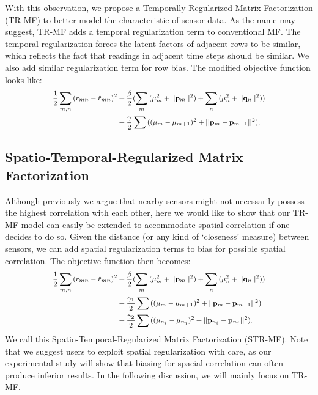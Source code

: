 With this observation, we propose a Temporally-Regularized Matrix Factorization (TR-MF) to better model the characteristic of sensor data. As the name may suggest, TR-MF adds a temporal regularization term to conventional MF.
The temporal regularization forces the latent factors of adjacent rows to be similar, which reflects the fact that 
readings in adjacent time steps should be similar. We also add similar regularization term for row bias.
The modified objective function looks like: 
\begin{equation*}\small \begin{aligned}
\frac{1}{2}\sum_{m,n}{(r_{mn} - \hat{r}_{mn})}^2
&+ \frac{\beta}{2}(\sum_m{(\mu_m^2 + ||\mathbf{p}_m||^2)} + \sum_n{(\mu_n^2 + ||\mathbf{q}_n||^2)}) \\
&+ \frac{\gamma}{2} \sum{((\mu_m-\mu_{m+1})^2 + ||\mathbf{p}_m-\mathbf{p}_{m+1}||^2)}.
\end{aligned}\end{equation*}

\subsection{Spatio-Temporal-Regularized Matrix Factorization}
Although previously we argue that nearby sensors might not necessarily possess the highest correlation with each other, 
here we would like to show that our TR-MF model can easily be extended to accommodate spatial correlation if one decides to do so. 
Given the distance (or any kind of `closeness' measure) between sensors, we can add spatial regularization terms to bias for 
possible spatial correlation.
The objective function then becomes: 
\begin{equation*}\small \begin{aligned}
\frac{1}{2}\sum_{m,n}{(r_{mn} - \hat{r}_{mn})}^2
&+ \frac{\beta}{2}(\sum_m{(\mu_m^2 + ||\mathbf{p}_m||^2)} + \sum_n{(\mu_n^2 + ||\mathbf{q}_n||^2)}) \\
&+ \frac{\gamma_1}{2} \sum{((\mu_m-\mu_{m+1})^2 + ||\mathbf{p}_m-\mathbf{p}_{m+1}||^2)}\\
&+ \frac{\gamma_2}{2} \sum{((\mu_{n_i}-\mu_{n_j})^2 + ||\mathbf{p}_{n_i}-\mathbf{p}_{n_j}||^2)}.
\end{aligned}\end{equation*}
We call this Spatio-Temporal-Regularized Matrix Factorization (STR-MF). Note that we suggest users to exploit spatial 
regularization with care, as our experimental study will show that biasing for spacial correlation can often produce inferior results. 
In the following discussion, we will mainly focus on TR-MF.

